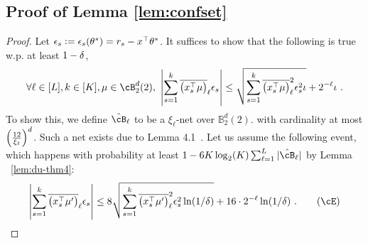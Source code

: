 \subsection{Proof of Lemma \ref{lem:confset}}
\begin{proof}
  Let $\epsilon_s := \epsilon_s({\theta}^*) = r_s - x^{\top}{\theta}^*$.
  It suffices to show that the following is true w.p. at least $1 - {\delta}$, 
  \begin{align*}
      \forall \ell\in[L], k\in[K], \mu\in \cB_2^d(2), ~ \lt|\sum_{s=1}^{k} \clip{x_s^\T \mu }_\ell \eps_s\rt| \le  \sqrt{\sum_{s=1}^{k} \clip{x_s^\T\mu }_\ell^2 \eps^2_s \iota } +  2^{-\ell}\iota ~.
  \end{align*}
  To show this, we define ${\hcB_\ell}$ to be a ${\xi_\ell}$-net over $\mathbb{B}_2^d(2)$.
  with cardinality at most $\del{\fr{12}{\xi_\ell} }^d$.
  Such a net exists due to Lemma 4.1~\cite{pollard1990empirical}.
  Let us assume the following event, which happens with probability at least $1-6K\log_2(K)\sum_{\ell=1}^L |\hcB_\ell|$ by Lemma ~\ref{lem:du-thm4}:
  \begin{align}\label{eq:lem-conf}
    \lt|\sum_{s=1}^{k} \clip{x_s^\T\mu' }_\ell \eps_s\rt| 
    \le 8\sqrt{\sum_{s=1}^{k} \clip{x_s^\T \mu' }_\ell^2 \eps_s^2 \ln(1/\dt)} +  16\cd 2^{-\ell}\ln(1/\dt)~. \tag{$\cE$}
  \end{align} 
  

\end{proof}
